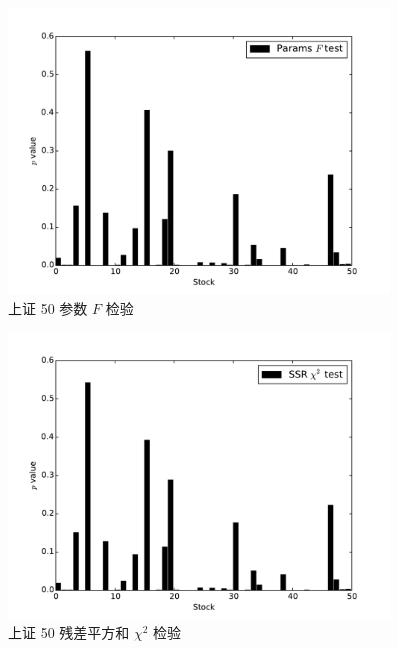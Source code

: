 \begin{figure}
  \centering
  \includegraphics[width=0.9\textwidth]{plots/granger_causality_test_on_sse_50_params_ftest.pdf}
  \caption{上证 50 参数 $F$ 检验}
  \label{f_test:13}
\end{figure}

\begin{figure}
  \centering
  \includegraphics[width=0.9\textwidth]{plots/granger_causality_test_on_sse_50_ssr_chi2test.pdf}
  \caption{上证 50 残差平方和 $\chi^{2}$ 检验}
  \label{f_test:14}
\end{figure}

